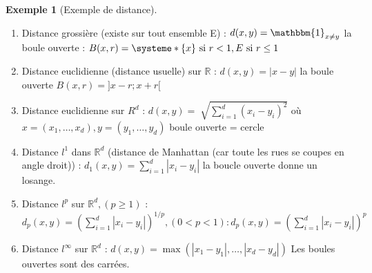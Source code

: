\documentclass{article}
\theoremstyle{plain}%
\theoremstyle{definition}
\newtheorem{exmp}{Exemple}[section]
\theoremstyle{remark}
\begin{document}
\begin{exmp}[Exemple de distance]
    \begin{enumerate}
        \item Distance grossière (existe sur tout ensemble E) : $ d(x,y) = \mathbbm{1}_{x \neq y} $ la boule ouverte : $ B(x,r) = \systeme*{
            \{x\} \text{ si } r < 1 ,
            E \text{ si } r \leq 1
        }$
        \item Distance euclidienne (distance usuelle) sur $ \mathbb{R} $ : $ d(x,y) = \left| x-y \right|  $ la boule ouverte $ B(x,r) = ]x-r;x+r[ $ 
        \item Distance euclidienne sur $ R^d $ : $ d(x,y) = \sqrt[]{\sum_{i=1}^{d}(x_i - y_i)^2} $ où $ x=(x_1, \dots, x_d), y=(y_1, \dots, y_d) $ boule ouverte = cercle
        \item Distance $ l^1 $ dans $ \mathbb{R}^d $ (distance de Manhattan (car toute les rues se coupes en angle droit)) : $ d_1 (x,y) = \sum_{i=1}^{d} \left| x_i - y_i \right| $ la boucle ouverte donne un losange.
        \item Distance $ l^p $ sur $ \mathbb{R}^d, (p \geq 1)$ : $ d_p (x,y) = (\sum_{i=1}^{d} \left| x_i - y_i \right| )^{1/p}, (0 < p < 1) : d_p (x,y) = (\sum_{i=1}^{d} \left| x_i - y_i \right| )^p$
        \item Distance $ l^\infty  $ sur $ \mathbb{R}^d $ : $ d(x,y) = \max (\left| x_1-y_1 \right| , \dots, \left| x_d -y_d \right| ) $ Les boules ouvertes sont des carrées.
    \end{enumerate}
\end{exmp}
\end{document}
